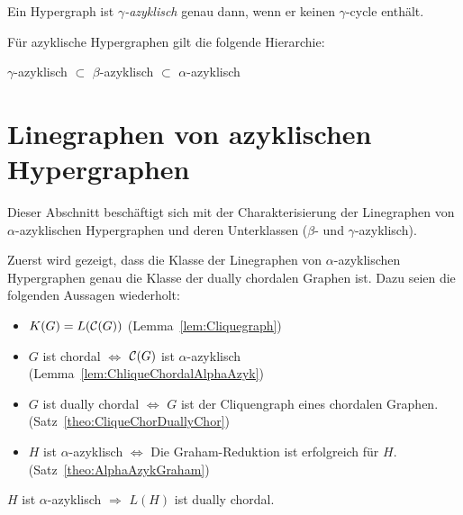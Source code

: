\begin{mydef}
    Ein Hypergraph ist \emph{$\gamma$-azyklisch} genau dann, wenn er keinen $\gamma$-cycle enthält.
\end{mydef}

Für azyklische Hypergraphen gilt die folgende Hierarchie:

\begin{Theorem}\label{theo:AzykHiera}\cite{Fagin1983}
    $\gamma$-azyklisch $\subset$ $\beta$-azyklisch $\subset$ $\alpha$-azyklisch
\end{Theorem}


\section{Linegraphen von azyklischen Hypergraphen}\label{sec:LinegraphOfHypergraph}

Dieser Abschnitt beschäftigt sich mit der Charakterisierung der Linegraphen von $\alpha$-azyklischen Hypergraphen und deren Unterklassen ($\beta$- und $\gamma$-azyklisch).


Zuerst wird gezeigt, dass die Klasse der Linegraphen von $\alpha$-azyklischen Hypergraphen genau die Klasse der dually chordalen Graphen ist. Dazu seien die folgenden Aussagen wiederholt:
\begin{itemize}

    \item $K(G) = L(\mathcal{C}(G))$ (Lemma~\ref{lem:Cliquegraph})
    
    \item $G$ ist chordal $\Leftrightarrow$ $\mathcal{C}(G)$ ist $\alpha$-azyklisch (Lemma~\ref{lem:ChliqueChordalAlphaAzyk})
    
    \item $G$ ist dually chordal $\Leftrightarrow$ $G$ ist der Cliquengraph eines chordalen Graphen. (Satz~\ref{theo:CliqueChorDuallyChor})
    
    \item $H$ ist $\alpha$-azyklisch $\Leftrightarrow$ Die Graham-Reduktion ist erfolgreich für $H$. (Satz~\ref{theo:AlphaAzykGraham})
    
\end{itemize}

\begin{Lemma}\label{lem:AlphaAzyklDuallyChordal}
    $H$ ist $\alpha$-azyklisch $\Rightarrow$ $L(H)$ ist dually chordal.
\end{Lemma}

